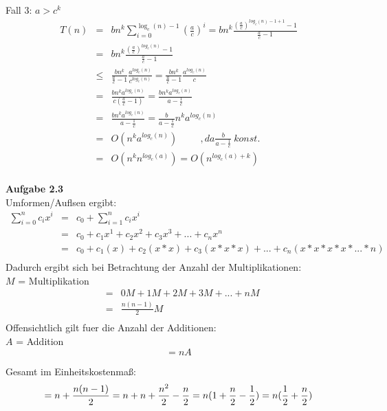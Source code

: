   Fall 3: $a > c^{k}$
  \begin{eqnarray}
  T(n) &=& bn^{k} \sum\limits_{i=0}^{\log_{c}(n) - 1}{({\frac{a}{c}})}^{i} = bn^{k} \frac{{(\frac{a}{c})}^{log_{c}(n)- 1 +1} - 1}{\frac{a}{c} - 1}\\
  &=& bn^{k} \frac{{(\frac{a}{c})}^{log_{c}(n)} - 1}{\frac{a}{c} - 1}\\
  &\leq& \frac{bn^{k}}{\frac{a}{c}-1} \frac{a^{log_{c}(n)}}{c^{log_{c}(n)}} = \frac{bn^{k}}{\frac{a}{c}-1} \frac{a^{log_{c}(n)}}{c}\\
  &=& \frac{bn^{k} a^{log_{c}(n)}}{c(\frac{a}{c} - 1)} = \frac{bn^{k} a^{log_{c}(n)}}{a- \frac{1}{c}}\\
  &=& \frac{bn^{k} a^{log_{c}(n)}}{a - \frac{1}{c}} = \frac{b}{a - \frac{1}{c}} n^{k}a^{log_{c}(n)}\\
  &=& O(n^{k}a^{log_{c}(n)}) \hspace{1cm}, da \frac{b}{a - \frac{1}{c}} \ konst.\\
  &=& O(n^{k}n^{log_{c}(a)}) = O(n^{log_{c}(a)+ k} )\\ 
  \end{eqnarray}
  
  

\textbf{Aufgabe 2.3}\\
\newline
Umformen/Aufl\ouml sen ergibt:\\
\begin{eqnarray*}
\sum\limits_{i=0}^{n}{c_i x^i} &=& c_0 + \sum\limits_{i=1}^{n}{c_i x^i}\\
&=& c_0 + c_1 x^1 + c_2 x^2 + c_3 x^3 + ... + c_n x^n\\
&=& c_0 + c_1 (x) + c_2 (x * x) + c_3 (x * x * x) + ... + c_n (x * x * x * x * ... *n)\\
\end{eqnarray*}
Dadurch ergibt sich bei Betrachtung der Anzahl der Multiplikationen:\\
$M$ = Multiplikation
\begin{eqnarray*}
&=& 0M + 1M + 2M + 3M + ... + nM\\
&=& \frac{n (n - 1)}{2}M\\
\end{eqnarray*}
Offensichtlich gilt fuer die Anzahl der Additionen:\\
$A$ = Addition
\begin{equation*}
= nA
\end{equation*}

Gesamt im Einheitskostenma\ss:\\
\begin{equation*}
= n + \frac{n (n - 1)}{2} = n + n + \frac{n^2}{2} - \frac{n}{2} = n (1 + \frac{n}{2} - \frac{1}{2}) = n(\frac{1}{2}+ \frac{n}{2})\\
\end{equation*}

